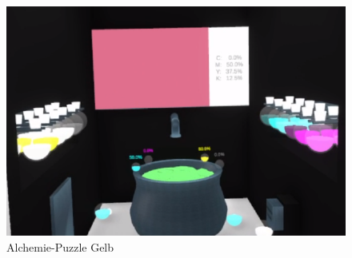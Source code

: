 \begin{figure}[h]
	\centering
	\includegraphics[width=\textwidth/2]{Pictures/Alchemie_Final}
	\caption{Alchemie-Puzzle Gelb}
	\label{fig:alchemie_final}
\end{figure}\newpage \noindent

